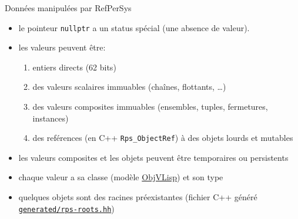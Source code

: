 \documentclass[final,a4,xcolor={svgnames,dvipsnames}]{beamer}
\begin{document}
 \begin{frame}{Données manipulées par RefPerSys}

   \begin{itemize}
   \item le pointeur \texttt{nullptr} a un status spécial (une absence de valeur).
   \item les valeurs {} peuvent être:
     \begin{enumerate}
     \item entiers directs (62 bits)
     \item des valeurs scalaires immuables (chaînes, flottants, \ldots)
     \item des valeurs composites immuables (ensembles, tuples,
     fermetures,  instances)
       \item des reférences (en C++ \texttt{Rps\_ObjectRef}) à des objets lourds et mutables
     \end{enumerate}
     \item les valeurs composites et les objets peuvent être
       temporaires ou persistents
       \item chaque valeur a sa classe (modèle
         \href{https://en.wikipedia.org/wiki/ObjVlisp}{ObjVLisp})
         et son type  {}
       \item quelques objets sont des racines préexistantes (fichier
         C++ généré \href{https://github.com/RefPerSys/RefPerSys/blob/master/generated/rps-roots.hh}{\texttt{generated/rps-roots.hh}})
   \end{itemize}

 \end{frame}
\end{document}
